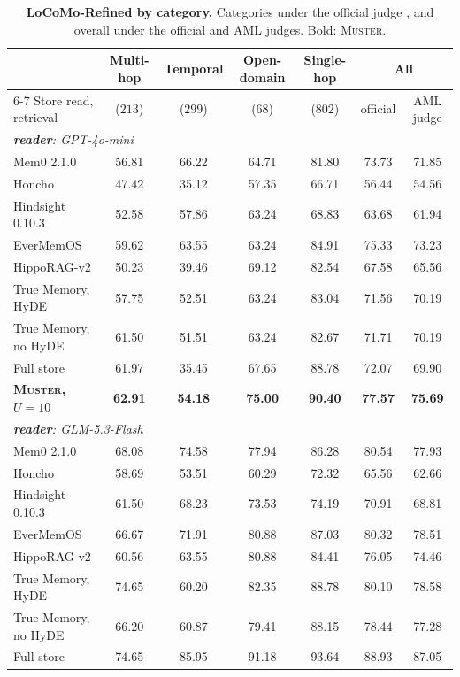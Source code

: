 \documentclass{article}
\newcommand{\ours}{\rowcolor{oursbg}}
\newcommand{\tabfont}{\fontsize{7.5}{8.5}\selectfont\renewcommand{\arraystretch}{1.0}}
\newcommand{\sys}{\textsc{Muster}}
\begin{document}
\begin{table}[!t]
\centering\tabfont
\caption{\textbf{LoCoMo-Refined by category.} Categories under the official judge \cite{locomorefined}, and overall under the official and AML \cite{aml} judges. Bold: \sys{}.}
\label{tab:refinedcat}
\setlength{\tabcolsep}{4pt}
\begin{tabular}{lcccccc}
\toprule
 & Multi-hop & Temporal & Open-domain & Single-hop & \multicolumn{2}{c}{All} \\
\cmidrule(lr){6-7}
Store read, retrieval & ($213$) & ($299$) & ($68$) & ($802$) & official & AML judge \\
\midrule
\multicolumn{7}{l}{\emph{\textbf{reader}: GPT-4o-mini}}\\
Mem0 2.1.0 & 56.81 & 66.22 & 64.71 & 81.80 & 73.73 & 71.85 \\
Honcho & 47.42 & 35.12 & 57.35 & 66.71 & 56.44 & 54.56 \\
Hindsight 0.10.3 & 52.58 & 57.86 & 63.24 & 68.83 & 63.68 & 61.94 \\
EverMemOS & 59.62 & 63.55 & 63.24 & 84.91 & 75.33 & 73.23 \\
HippoRAG-v2 & 50.23 & 39.46 & 69.12 & 82.54 & 67.58 & 65.56 \\
True Memory, HyDE & 57.75 & 52.51 & 63.24 & 83.04 & 71.56 & 70.19 \\
True Memory, no HyDE & 61.50 & 51.51 & 63.24 & 82.67 & 71.71 & 70.19 \\
Full store & 61.97 & 35.45 & 67.65 & 88.78 & 72.07 & 69.90 \\
\ours \textbf{\sys{}, $U{=}10$} & \textbf{62.91} & \textbf{54.18} & \textbf{75.00} & \textbf{90.40} & \textbf{77.57} & \textbf{75.69} \\
\multicolumn{7}{l}{\emph{\textbf{reader}: GLM-5.3-Flash}}\\
Mem0 2.1.0 & 68.08 & 74.58 & 77.94 & 86.28 & 80.54 & 77.93 \\
Honcho & 58.69 & 53.51 & 60.29 & 72.32 & 65.56 & 62.66 \\
Hindsight 0.10.3 & 61.50 & 68.23 & 73.53 & 74.19 & 70.91 & 68.81 \\
EverMemOS & 66.67 & 71.91 & 80.88 & 87.03 & 80.32 & 78.51 \\
HippoRAG-v2 & 60.56 & 63.55 & 80.88 & 84.41 & 76.05 & 74.46 \\
True Memory, HyDE & 74.65 & 60.20 & 82.35 & 88.78 & 80.10 & 78.58 \\
True Memory, no HyDE & 66.20 & 60.87 & 79.41 & 88.15 & 78.44 & 77.28 \\
Full store & 74.65 & 85.95 & 91.18 & 93.64 & 88.93 & 87.05 \\

\end{tabular}
\end{table}
\end{document}
